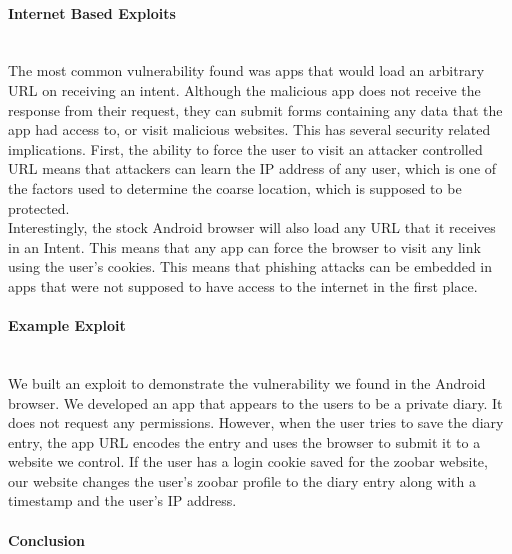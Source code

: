 \documentclass[12pt,a4paper]{article}
\begin{document}
\paragraph{Internet Based Exploits} ~\\ The most common vulnerability found was
apps that would load an arbitrary URL on receiving an intent. Although the
malicious app does not receive the response from their request, they can submit
forms containing any data that the app had access to, or visit malicious
websites. This has several security related implications. First, the ability to
force the user to visit an attacker controlled URL means that attackers can
learn the IP address of any user, which is one of the factors used to determine
the coarse location, which is supposed to be protected.  \\ Interestingly, the
stock Android browser will also load any URL that it receives in an Intent. This
means that any app can force the browser to visit any link using the user's
cookies. This means that phishing attacks can be embedded in apps that were not
supposed to have access to the internet in the first place.

\paragraph{Example Exploit} ~\\
We built an exploit to demonstrate the vulnerability we found in the Android
browser. We developed an app that appears to the users to be a private diary. It
does not request any permissions. However, when the user tries to save the diary
entry, the app URL encodes the entry and uses the browser to submit it to a
website we control. If the user has a login cookie saved for the zoobar website,
our website changes the user's zoobar profile to the diary entry along with a
timestamp and the user's IP address.

\paragraph{Conclusion} ~\\

 
\end{document}

